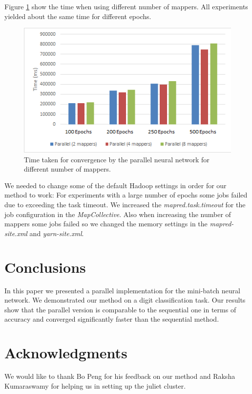 \documentclass{sig-alternate-05-2015}
\begin{document}
Figure \ref{map_NN} show the time when using different number of mappers. All experiments yielded about the same time for different epochs. 
\begin{figure}[h!]
\centering
\includegraphics[width=\columnwidth]{img/time_map}
\caption{Time taken for convergence by the parallel neural network for different number of mappers.}
\label{map_NN}
\end{figure}

We needed to change some of the default Hadoop settings in order for our method to work:  For experiments with a large number of epochs some jobs failed due to exceeding the task timeout. We increased the \textit{mapred.task.timeout} for the job configuration in the \textit{MapCollective}. Also when increasing the number of mappers some jobs failed so we changed the memory settings in the \textit{mapred-site.xml} and \textit{yarn-site.xml}.

\section{Conclusions} \label{C}
In this paper we presented a parallel implementation for the mini-batch neural network. We demonstrated our method on a digit classification task. Our results show that the parallel version is comparable to the sequential one in terms of accuracy and converged significantly faster than the sequential method.

%


 
\appendix

\section{Acknowledgments}
We would like to thank Bo Peng for his feedback on our method and Raksha Kumaraswamy for helping us in setting up the juliet cluster.\\
\end{document}
